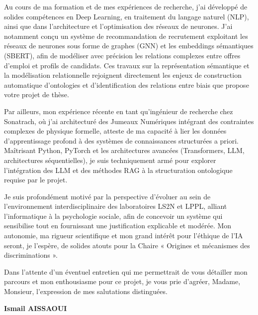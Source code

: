 \documentclass[11pt,a4paper]{letter}
\begin{document}
Au cours de ma formation et de mes expériences de recherche, j'ai développé de solides compétences en Deep Learning, en traitement du langage naturel (NLP), ainsi que dans l'architecture et l'optimisation des réseaux de neurones. J'ai notamment conçu un système de recommandation de recrutement exploitant les réseaux de neurones sous forme de graphes (GNN) et les embeddings sémantiques (SBERT), afin de modéliser avec précision les relations complexes entre offres d'emploi et profils de candidats. Ces travaux sur la représentation sémantique et la modélisation relationnelle rejoignent directement les enjeux de construction automatique d'ontologies et d'identification des relations entre biais que propose votre projet de thèse.

Par ailleurs, mon expérience récente en tant qu'ingénieur de recherche chez Sonatrach, où j'ai architecturé des Jumeaux Numériques intégrant des contraintes complexes de physique formelle, atteste de ma capacité à lier les données d'apprentissage profond à des systèmes de connaissances structurées a priori. Maîtrisant Python, PyTorch et les architectures avancées (Transformers, LLM, architectures séquentielles), je suis techniquement armé pour explorer l'intégration des LLM et des méthodes RAG à la structuration ontologique requise par le projet. 

Je suis profondément motivé par la perspective d'évoluer au sein de l'environnement interdisciplinaire des laboratoires LS2N et LPPL, alliant l'informatique à la psychologie sociale, afin de concevoir un système qui sensibilise tout en fournissant une justification explicable et modérée. Mon autonomie, ma rigueur scientifique et mon grand intérêt pour l'éthique de l'IA seront, je l'espère, de solides atouts pour la Chaire « Origines et mécanismes des discriminations ».

Dans l'attente d'un éventuel entretien qui me permettrait de vous détailler mon parcours et mon enthousiasme pour ce projet, je vous prie d'agréer, Madame, Monsieur, l'expression de mes salutations distinguées.

\vspace{1cm}
\textbf{Ismail AISSAOUI}
\end{document}
